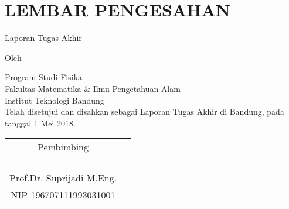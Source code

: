 \clearpage
\thispagestyle{empty}
\chapter*{LEMBAR PENGESAHAN}

\begin{center}
\smallskip
    \Large \bfseries \thetitle

    \Large Laporan Tugas Akhir
    \vfill

    \large Oleh

    \Large \theauthor

    \large Program Studi Fisika \\
    Fakultas Matematika \& Ilmu Pengetahuan Alam \\
    Institut Teknologi Bandung \\

    \vfill
    \normalsize \normalfont
    Telah disetujui dan disahkan sebagai Laporan Tugas Akhir di Bandung, pada tanggal 1 Mei 2018.

    \vfill
    \setlength{\tabcolsep}{12pt}
    \begin{tabular}{c@{\hskip 0.5in}c}
        Pembimbing\\
        \\
        \\
        \\
        \\
        Prof.Dr. Suprijadi M.Eng. \\
        NIP 196707111993031001 \\
    \end{tabular}

\end{center}
\clearpage
